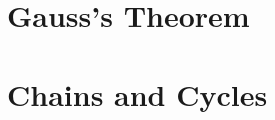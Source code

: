 \documentclass[12pt]{book}
\begin{document}
\section{Gauss's Theorem}



\section{Chains and Cycles}




\end{document}
